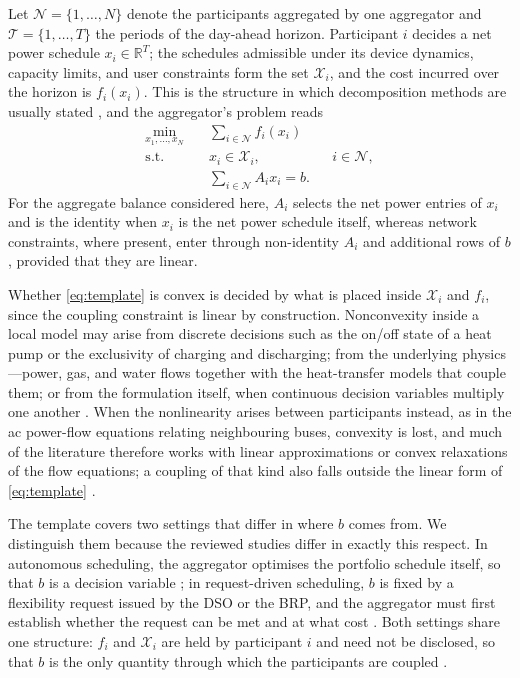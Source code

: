 \documentclass[conference]{IEEEtran}
\begin{document}
Let $\mathcal{N} = \{1,\dots,N\}$ denote the participants aggregated by one aggregator and $\mathcal{T} = \{1,\dots,T\}$ the periods of the day-ahead horizon. Participant $i$ decides a net power schedule $x_i \in \mathbb{R}^{T}$; the schedules admissible under its device dynamics, capacity limits, and user constraints form the set $\mathcal{X}_i$, and the cost incurred over the horizon is $f_i(x_i)$. This is the structure in which decomposition methods are usually stated \cite{Molzahn2017}, and the aggregator's problem reads
\begin{equation}
\begin{aligned}
\min_{x_1,\dots,x_N} \quad & \sum_{i \in \mathcal{N}} f_i(x_i) \\
\text{s.t.} \quad & x_i \in \mathcal{X}_i, && i \in \mathcal{N}, \\
& \sum_{i \in \mathcal{N}} A_i x_i = b .
\end{aligned}
\label{eq:template}
\end{equation}
For the aggregate balance considered here, $A_i$ selects the net power entries of $x_i$ and is the identity when $x_i$ is the net power schedule itself, whereas network constraints, where present, enter through non-identity $A_i$ and additional rows of $b$, provided that they are linear.

Whether \eqref{eq:template} is convex is decided by what is placed inside $\mathcal{X}_i$ and $f_i$, since the coupling constraint is linear by construction. Nonconvexity inside a local model may arise from discrete decisions such as the on/off state of a heat pump or the exclusivity of charging and discharging; from the underlying physics---power, gas, and water flows together with the heat-transfer models that couple them; or from the formulation itself, when continuous decision variables multiply one another \cite{DallAnese2017}. When the nonlinearity arises between participants instead, as in the ac power-flow equations relating neighbouring buses, convexity is lost, and much of the literature therefore works with linear approximations or convex relaxations of the flow equations; a coupling of that kind also falls outside the linear form of \eqref{eq:template} \cite{Molzahn2017}.

The template covers two settings that differ in where $b$ comes from. We distinguish them because the reviewed studies differ in exactly this respect. In autonomous scheduling, the aggregator optimises the portfolio schedule itself, so that $b$ is a decision variable \cite{Diekerhof2018}; in request-driven scheduling, $b$ is fixed by a flexibility request issued by the DSO or the BRP, and the aggregator must first establish whether the request can be met and at what cost \cite{OlivellaRosell2020}. Both settings share one structure: $f_i$ and $\mathcal{X}_i$ are held by participant $i$ and need not be disclosed, so that $b$ is the only quantity through which the participants are coupled \cite{Molzahn2017}.
\end{document}
